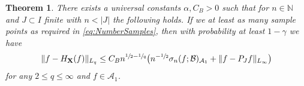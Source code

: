 \documentclass[10pt,a4paper]{amsart}
\newtheorem{theorem}{Theorem}
\begin{document}
\begin{theorem}\label{thm:Error_Recovery_Ops}
There exists a universal constants $\alpha, C_B>0$ such that for $n \in \mathbb{N}$ and $J\subset I$ finite with $n<\lvert J\rvert$ the following holds.
If we at least as many sample points  as required in \eqref{eq:NumberSamples}, then with probability at least $1-\gamma$ we have
\begin{gather}\label{eq:ErrorEstimateRIP}
	\lVert f - H_{\mathbf{X}}(f)\rVert_{L_q} \leq C_B n^{\sfrac{1}{2}-\sfrac{1}{q}}\big(n^{-\sfrac{1}{2}}\sigma_n(f;\mathcal{B})_{\mathcal{A}_1} + \lVert f-P_Jf\rVert_{L_\infty}\big)
\end{gather}
for any $2\leq q\leq \infty$ and $f \in \mathcal{A}_1$.
\end{theorem}
\end{document}
